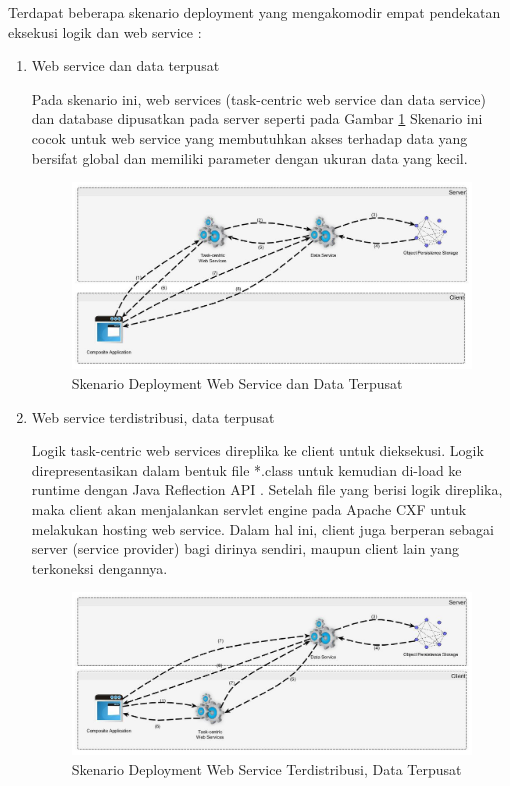 Terdapat beberapa skenario deployment yang mengakomodir empat pendekatan eksekusi logik dan web service :
\begin{enumerate}
\item Web service dan data terpusat

Pada skenario ini, web services (task-centric web service dan data service) dan database dipusatkan pada server seperti pada Gambar \ref{fig:deployment-1} Skenario ini cocok untuk web service yang membutuhkan akses terhadap data yang bersifat global dan memiliki parameter dengan ukuran data yang kecil.

\begin{figure}[h]
    \centering
    \includegraphics[width=13cm]{../../Resources/Images/takdir-deployment-1}
    \caption{Skenario Deployment Web Service dan Data Terpusat}
    \label{fig:deployment-1}
\end{figure}

\item Web service terdistribusi, data terpusat

Logik task-centric web services direplika ke client untuk dieksekusi. Logik direpresentasikan dalam bentuk file *.class untuk kemudian di-load ke runtime dengan Java Reflection API . Setelah file yang berisi logik direplika, maka client akan menjalankan servlet engine pada Apache CXF untuk melakukan hosting web service. Dalam hal ini, client juga berperan sebagai server (service provider) bagi dirinya sendiri, maupun client lain yang terkoneksi dengannya.

\begin{figure}[h]
    \centering
    \includegraphics[width=13cm]{../../Resources/Images/takdir-deployment-2}
    \caption{Skenario Deployment Web Service Terdistribusi, Data Terpusat}
    \label{fig:deployment-2}
\end{figure}


\end{enumerate}
